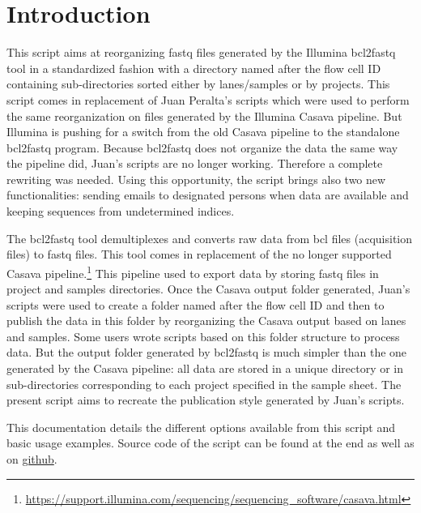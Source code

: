 \documentclass[11pt]{report}
\begin{document}



\tableofcontents



 \chapter*{Introduction}

This script aims at reorganizing fastq files generated by the Illumina bcl2fastq tool in a standardized fashion with a directory named after the flow cell ID containing sub-directories sorted either by lanes/samples or by projects. This script comes in replacement of Juan Peralta's scripts which were used to perform the same reorganization on files generated by the Illumina Casava pipeline. But Illumina is pushing for a switch from the old Casava pipeline to the standalone bcl2fastq program. Because bcl2fastq does not organize the data the same way the pipeline did, Juan's scripts are no longer working. Therefore a complete rewriting was needed. Using this opportunity, the script brings also two new functionalities: sending emails to designated persons when data are available and keeping sequences from undetermined indices.

The bcl2fastq tool demultiplexes and converts raw data from bcl files (acquisition files) to fastq files. This tool comes in replacement of the no longer supported Casava pipeline.\footnote{\url{https://support.illumina.com/sequencing/sequencing_software/casava.html}} This pipeline used to export data by storing fastq files in project and samples directories. Once the Casava output folder generated, Juan's scripts were used to create a folder named after the flow cell ID and then to publish the data in this folder by reorganizing the Casava output based on lanes and samples. Some users wrote scripts based on this folder structure to process data. But the output folder generated by bcl2fastq is much simpler than the one generated by the Casava pipeline: all data are stored in a unique directory or in sub-directories corresponding to each project specified in the sample sheet. The present script aims to recreate the publication style generated by Juan's scripts.

This documentation details the different options available from this script and basic usage examples. Source code of the script can be found at the end as well as on \href{https://github.com/fdchevalier/publish-fq}{github}.
\end{document}
